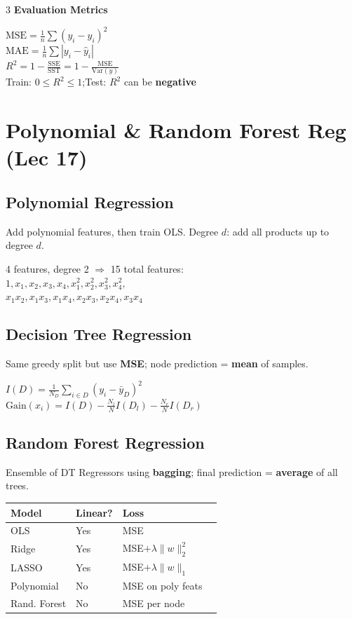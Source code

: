 \documentclass[8pt,letterpaper]{extarticle}
\begin{document}
\begin{multicols}{3}
\textbf{Evaluation Metrics}
\begin{formulabox}
$\text{MSE} = \frac{1}{n}\sum(y_i-\hat{y}_i)^2$\\
$\text{MAE} = \frac{1}{n}\sum|y_i-\hat{y}_i|$\\
$R^2 = 1 - \frac{\text{SSE}}{\text{SST}} = 1 - \frac{\text{MSE}}{\text{Var}(y)}$\\
Train: $0 \leq R^2 \leq 1$;\quad Test: $R^2$ can be \textbf{negative}
\end{formulabox}

\section{Polynomial \& Random Forest Reg (Lec 17)}

\subsection{Polynomial Regression}
Add polynomial features, then train OLS. Degree $d$: add all products up to degree $d$.
\begin{formulabox}
4 features, degree 2 $\Rightarrow$ 15 total features:\\
$1, x_1,x_2,x_3,x_4, x_1^2,x_2^2,x_3^2,x_4^2,$\\
$x_1x_2, x_1x_3, x_1x_4, x_2x_3, x_2x_4, x_3x_4$
\end{formulabox}

\subsection{Decision Tree Regression}
Same greedy split but use \textbf{MSE}; node prediction = \textbf{mean} of samples.
\begin{formulabox}
$I(D) = \frac{1}{N_D}\sum_{i\in D}(y_i - \bar{y}_D)^2$\\
$\text{Gain}(x_i) = I(D) - \frac{N_l}{N}I(D_l) - \frac{N_r}{N}I(D_r)$
\end{formulabox}

\subsection{Random Forest Regression}
Ensemble of DT Regressors using \textbf{bagging}; final prediction = \textbf{average} of all trees.

\begin{center}\footnotesize
\begin{tabular}{@{}llll@{}}
\toprule
\textbf{Model} & \textbf{Linear?} & \textbf{Loss}\\
\midrule
OLS & Yes & MSE\\
Ridge & Yes & MSE$+\lambda\|w\|_2^2$\\
LASSO & Yes & MSE$+\lambda\|w\|_1$\\
Polynomial & No & MSE on poly feats\\
Rand. Forest & No & MSE per node\\
\bottomrule
\end{tabular}
\end{center}


\end{multicols}
\end{document}
